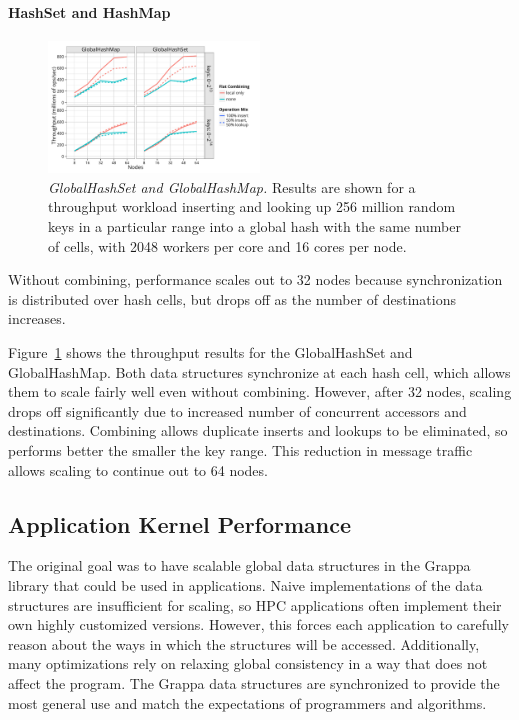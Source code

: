 \paragraph{HashSet and HashMap}
\begin{figure}[t]
  \centering
  \includegraphics[width=0.5\textwidth]{data/plots/hash_perf.pdf}
  \caption{\emph{GlobalHashSet and GlobalHashMap.}
    Results are shown for a throughput workload inserting and looking up 256 million random keys in a particular range into a global hash with the same number of cells, with 2048 workers per core and 16 cores per node.
  }
  \label{fig:hash_perf}
\end{figure}

Without combining, performance scales out to 32 nodes because synchronization is distributed over hash cells, but drops off as the number of destinations increases.

Figure~\ref{fig:hash_perf} shows the throughput results for the GlobalHashSet and GlobalHashMap.
Both data structures synchronize at each hash cell, which allows them to scale fairly well even without combining. However, after 32 nodes, scaling drops off significantly due to increased number of concurrent accessors and destinations.
Combining allows duplicate inserts and lookups to be eliminated, so performs better the smaller the key range. This reduction in message traffic allows scaling to continue out to 64 nodes.

\subsection{Application Kernel Performance}
The original goal was to have scalable global data structures in the Grappa library that could be used in applications. Naive implementations of the data structures are insufficient for scaling, so HPC applications often implement their own highly customized versions. However, this forces each application to carefully reason about the ways in which the structures will be accessed. Additionally, many optimizations rely on relaxing global consistency in a way that does not affect the program. 
The Grappa data structures are synchronized to provide the most general use and match the expectations of programmers and algorithms.

